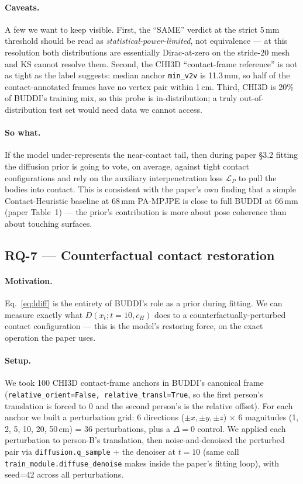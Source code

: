 \documentclass[10pt]{article}
\begin{document}
\paragraph{Caveats.}
A few we want to keep visible. First, the ``SAME'' verdict at the strict 5\,mm threshold should be read as \emph{statistical-power-limited}, not equivalence --- at this resolution both distributions are essentially Dirac-at-zero on the stride-20 mesh and KS cannot resolve them. Second, the CHI3D ``contact-frame reference'' is not as tight as the label suggests: median anchor \texttt{min\_v2v} is 11.3\,mm, so half of the contact-annotated frames have no vertex pair within 1\,cm. Third, CHI3D is 20\% of BUDDI's training mix, so this probe is in-distribution; a truly out-of-distribution test set would need data we cannot access.

\paragraph{So what.}
If the model under-represents the near-contact tail, then during paper §3.2 fitting the diffusion prior is going to vote, on average, against tight contact configurations and rely on the auxiliary interpenetration loss $\mathcal{L}_P$ to pull the bodies into contact. This is consistent with the paper's own finding that a simple Contact-Heuristic baseline at 68\,mm PA-MPJPE is close to full BUDDI at 66\,mm (paper Table~1) --- the prior's contribution is more about pose coherence than about touching surfaces.

\subsection{RQ-7 --- Counterfactual contact restoration}
\label{sec:rq7}

\paragraph{Motivation.}
Eq.~\ref{eq:ldiff} is the entirety of BUDDI's role as a prior during fitting. We can measure exactly what $D(x_t; t=10, c_H)$ does to a counterfactually-perturbed contact configuration --- this is the model's restoring force, on the exact operation the paper uses.

\paragraph{Setup.}
We took 100 CHI3D contact-frame anchors in BUDDI's canonical frame (\texttt{relative\_orient=False, relative\_transl=True}, so the first person's translation is forced to 0 and the second person's is the relative offset). For each anchor we built a perturbation grid: 6 directions ($\pm x, \pm y, \pm z$) $\times$ 6 magnitudes (1, 2, 5, 10, 20, 50\,cm) = 36 perturbations, plus a $\Delta{=}0$ control. We applied each perturbation to person-B's translation, then noise-and-denoised the perturbed pair via \texttt{diffusion.q\_sample} + the denoiser at $t{=}10$ (same call \texttt{train\_module.diffuse\_denoise} makes inside the paper's fitting loop), with seed=42 across all perturbations.
\end{document}
